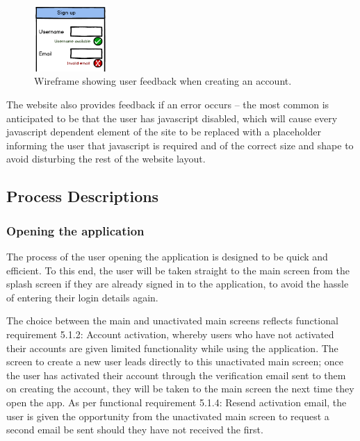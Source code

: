 \begin{figure}
	\vspace{-20pt}
	\begin{center}
	\includegraphics[width=0.25\textwidth]{images/sign_up_wireframe}
	\caption{Wireframe showing user feedback when creating an account.}
	\label{sign_up_wireframe}
	\end{center}
\end{figure}

The website also provides feedback if an error occurs – the most common is anticipated to be that the user has javascript disabled, which will cause every javascript dependent element of the site to be replaced with a placeholder informing the user that javascript is required and of the correct size and shape to avoid disturbing the rest of the website layout.
\vspace{80pt}
\subsection{Process Descriptions}

\subsubsection{Opening the application}
The process of the user opening the application is designed to be quick and efficient. To this end, the user will be taken straight to the main screen from the splash screen if they are already signed in to the application, to avoid the hassle of entering their login details again.

The choice between the main and unactivated main screens reflects functional requirement 5.1.2: Account activation, whereby users who have not activated their accounts are given limited functionality while using the application. The screen to create a new user leads directly to this unactivated main screen; once the user has activated their account through the verification email sent to them on creating the account, they will be taken to the main screen the next time they open the app. As per functional requirement 5.1.4: Resend activation email, the user is given the opportunity from the unactivated main screen to request a second email be sent should they have not received the first.

